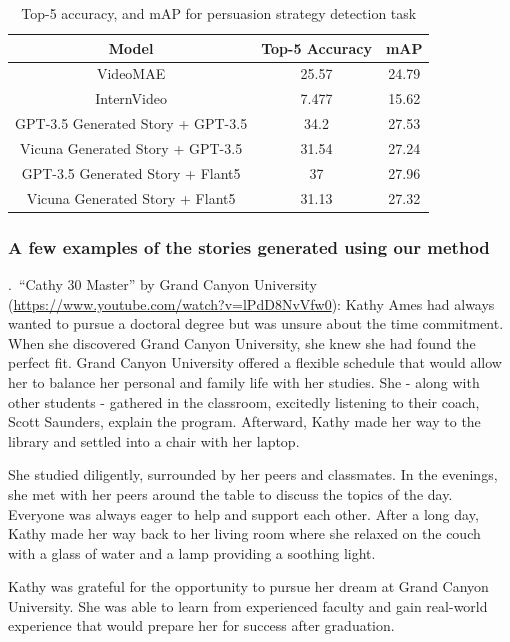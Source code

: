\documentclass[hidelinks,11pt,a4paper]{report}
\begin{document}
\begin{table}[!h]
\centering
\begin{adjustbox}{max width=0.8\textwidth}
\begin{tabular}{ccc}
\toprule
Model & Top-5 Accuracy & mAP \\
\midrule
VideoMAE & 25.57 & 24.79 \\
InternVideo & 7.477 & 15.62 \\
GPT-3.5 Generated Story + GPT-3.5 & 34.2 & 27.53 \\
Vicuna Generated Story + GPT-3.5 & 31.54 & 27.24 \\
GPT-3.5 Generated Story + Flant5 & 37 & 27.96 \\
Vicuna Generated Story + Flant5 & 31.13 & 27.32 \\
\bottomrule
\end{tabular}
\end{adjustbox}
\caption{Top-5 accuracy, and mAP for persuasion strategy detection task}
\end{table}





\subsubsection{A few examples of the stories generated using our method}
\label{sec:examples-stories-generated}
    .~``Cathy 30 Master'' by Grand Canyon University (\url{https://www.youtube.com/watch?v=lPdD8NvVfw0}): 
    Kathy Ames had always wanted to pursue a doctoral degree but was unsure about the time commitment. When she discovered Grand Canyon University, she knew she had found the perfect fit. Grand Canyon University offered a flexible schedule that would allow her to balance her personal and family life with her studies. She - along with other students - gathered in the classroom, excitedly listening to their coach, Scott Saunders, explain the program. Afterward, Kathy made her way to the library and settled into a chair with her laptop. 
    
    She studied diligently, surrounded by her peers and classmates. In the evenings, she met with her peers around the table to discuss the topics of the day. Everyone was always eager to help and support each other. After a long day, Kathy made her way back to her living room where she relaxed on the couch with a glass of water and a lamp providing a soothing light. 
    
    Kathy was grateful for the opportunity to pursue her dream at Grand Canyon University. She was able to learn from experienced faculty and gain real-world experience that would prepare her for success after graduation. 
    
\end{document}
